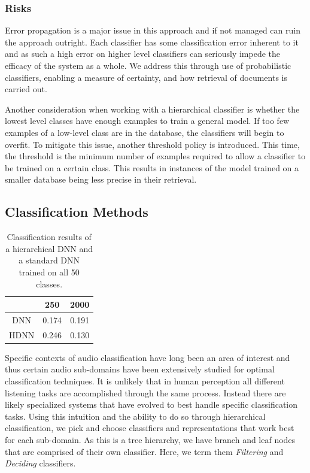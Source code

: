\subsubsection{Risks}
Error propagation is a major issue in this approach and if not managed can ruin the approach outright. Each classifier has some classification error inherent to it and as such a high error on higher level classifiers can seriously impede the efficacy of the system as a whole. We address this through use of probabilistic classifiers, enabling a measure of certainty, and how retrieval of documents is carried out.

Another consideration when working with a hierarchical classifier is whether the lowest level classes have enough examples to train a general model. If too few examples of a low-level class are in the database, the classifiers will begin to overfit. To mitigate this issue, another threshold policy is introduced. This time, the threshold is the minimum number of examples required to allow a classifier to be trained on a certain class. This results in instances of the model trained on a smaller database being less precise in their retrieval.

\subsection{Classification Methods}
\label{sec:classification-methods}

\begin{table}[t]
    \centering
    \begin{tabular}{ccc}
         & 250   & 2000  \\ \hline
    DNN  & 0.174 & 0.191 \\
    HDNN & 0.246 & 0.130
    \end{tabular}
    \caption{Classification results of a hierarchical DNN and a standard DNN trained on all 50 classes.}
    \label{tab:classifier}
\end{table}


Specific contexts of audio classification have long been an area of interest and thus certain audio sub-domains have been extensively studied for optimal classification techniques. It is unlikely that in human perception all different listening tasks are accomplished through the same process. Instead there are likely specialized systems that have evolved to best handle specific classification tasks. Using this intuition and the ability to do so through hierarchical classification, we pick and choose classifiers and representations that work best for each sub-domain. As this is a tree hierarchy, we have branch and leaf nodes that are comprised of their own classifier. Here, we term them \textit{Filtering} and \textit{Deciding} classifiers.

